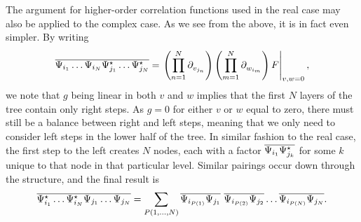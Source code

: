 The argument for higher-order correlation functions used in the real case may also be applied to the complex case. As we see from the above, it is in fact even simpler. By writing
\begin{align*}
	\overline{\Psi_{i_{1}}\dots\Psi_{i_{N}}\Psi_{j_{1}}\cc\dots\Psi_{j_{N}}\cc} = \eval{\left(\prod\limits_{n = 1}^{N}\del{}{v_{j_{n}}}\right)\left(\prod\limits_{m = 1}^{N}\del{}{w_{i_{m}}}\right)F}_{v, w = 0},
\end{align*}
we note that $g$ being linear in both $v$ and $w$ implies that the first $N$ layers of the tree contain only right steps. As $g = 0$ for either $v$ or $w$ equal to zero, there must still be a balance between right and left steps, meaning that we only need to consider left steps in the lower half of the tree. In similar fashion to the real case, the first step to the left creates $N$ nodes, each with a factor $\overline{\Psi_{i_{1}}\Psi_{j_{k}}^{\star}}$ for some $k$ unique to that node in that particular level. Similar pairings occur down through the structure, and the final result is
\begin{align*}
	\overline{\Psi_{i_{1}}\cc\dots\Psi_{i_{N}}\cc\Psi_{j_{1}}\dots\Psi_{j_{N}}} = \sum\limits_{P(1, \dots, N)}\overline{\Psi_{i_{P(1)}}\Psi_{j_{1}}}\ \overline{\Psi_{i_{P(2)}}\Psi_{j_{2}}}\dots\overline{\Psi_{i_{P(N)}}\Psi_{j_{N}}}.
\end{align*}